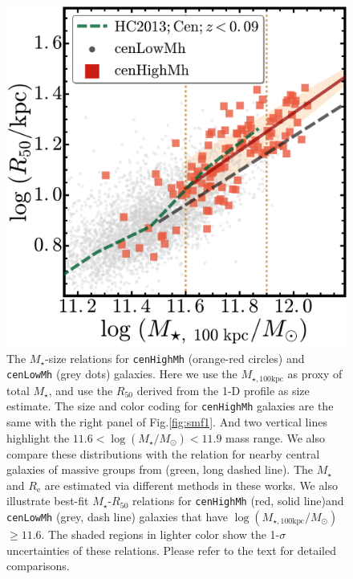 \documentclass{emulateapj}
\def\rbcg{\texttt{cenHighMh}}
\def\nbcg{\texttt{cenLowMh}}
\def\mstar{{$M_{\star}$}}
\def\logms{{$\log (M_{\star}/M_{\odot})$}}
\def\mtot{{$M_{\star,100\mathrm{kpc}}$}}
\def\logmtot{{$\log (M_{\star,100\mathrm{kpc}}/M_{\odot})$}}
\begin{document}
\begin{CJK*}{UTF8}{gbsn}
  \begin{figure}[bt!]
      \centering 
      \includegraphics[width=\columnwidth]{fig/redbcg_mass_r50}
      \caption{The \mstar{}-size relations for \rbcg{} (orange-red circles) and \nbcg{} 
          (grey dots) galaxies. 
          Here we use the \mtot{} as proxy of total \mstar{}, and use the 
          $R_{\mathrm{50}}$ derived from the 1-D profile as size estimate. 
          The size and color coding for \rbcg{} galaxies are the same with the right panel 
          of Fig.\ref{fig:smf1}.  
          And two vertical lines highlight the $11.6<$\logms{}$<11.9$ mass range.
          We also compare these distributions with the relation for nearby central 
          galaxies of massive groups from \citet{HCompany13} (green, long dashed line). 
          The \mstar{} and $R_{\mathrm{e}}$ are estimated via different methods in these
          works. 
          We also illustrate best-fit \mstar{}-$R_{50}$ relations for \rbcg{} (red, solid 
          line)and \nbcg{} (grey, dash line) galaxies that have \logmtot{}$\geq 11.6$.
          The shaded regions in lighter color show the 1-$\sigma$ uncertainties of these 
          relations.
          Please refer to the text for detailed comparisons.}
      \label{fig:mass_r50}
  \end{figure}


\end{CJK*}
\end{document}
